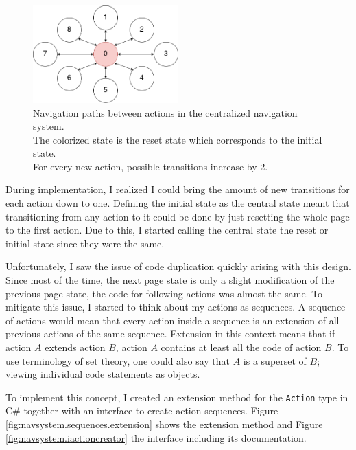 \begin{figure}
\centering
\includegraphics[width=0.5\textwidth]{figures/navigationsystem-diagram/navigationsystem-central-overview.png}
\caption[Navigation paths in centralized navigation system]{Navigation paths between actions in the centralized navigation system. \\The colorized state is the reset state which corresponds to the initial state.\\For every new action, possible transitions increase by 2.}
\label{fig:navsystem.central.overview}
\end{figure}

During implementation, I realized I could bring the amount of new transitions for each action down to one. Defining the initial state as the central state meant that transitioning from any action to it could be done by just resetting the whole page to the first action. Due to this, I started calling the central state the reset or initial state since they were the same.

Unfortunately, I saw the issue of code duplication quickly arising with this design. Since most of the time, the next page state is only a slight modification of the previous page state, the code for following actions was almost the same. To mitigate this issue, I started to think about my actions as sequences. A sequence of actions would mean that every action inside a sequence is an extension of all previous actions of the same sequence. Extension in this context means that if action $A$ extends action $B$, action $A$ contains at least all the code of action $B$. To use terminology of set theory, one could also say that $A$ is a superset of $B$; viewing individual code statements as objects.

To implement this concept, I created an extension method for the \texttt{Action} type in C\# together with an interface to create action sequences. Figure \ref{fig:navsystem.sequences.extension} shows the extension method and Figure \ref{fig:navsystem.iactioncreator} the interface including its documentation.

